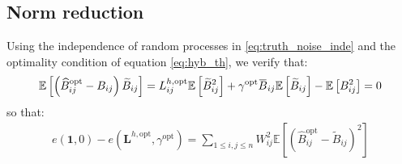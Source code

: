 \documentclass[12pt]{scrartcl}
\newcommand{\overbar}[1]{\mkern 1.5mu\overline{\mkern-1.5mu#1\mkern-1.5mu}\mkern 1.5mu}
\begin{document}
\subsection{Norm reduction}
Using the independence of random processes in \eqref{eq:truth_noise_inde} and the optimality condition of equation \eqref{eq:hyb_th}, we verify that:
\begin{align}
\mathbb{E}\left[\left(\widehat{B}_{ij}^\mathrm{opt} - B_{ij}\right) \widetilde{B}_{ij} \right] = L_{ij}^{h,\mathrm{opt}} \mathbb{E}\left[\widetilde{B}_{ij}^2\right] + \gamma^\mathrm{opt} \overbar{B}_{ij} \mathbb{E}\left[\widetilde{B}_{ij}\right] - \mathbb{E}\left[B^2_{ij} \right] = 0
\end{align}
so that:
\begin{align}
e\left(\boldsymbol{1},0\right) - e\left(\mathbf{L}^{h,\mathrm{opt}},\gamma^\mathrm{opt}\right) = \sum_{1 \le i,j \le n} W_{ij}^2 \mathbb{E}\left[ \left(\widehat{B}_{ij}^\mathrm{opt} - \widetilde{B}_{ij}\right)^2\right]
\end{align}
\end{document}
